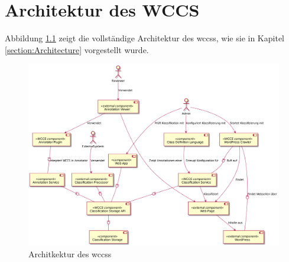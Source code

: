 \chapter{Architektur des WCCS}
    Abbildung \ref{image:wccsExternalArchitecture} zeigt die vollständige Architektur des \glspl{wccs},
    wie sie in Kapitel \ref{section:Architecture} vorgestellt wurde.

    \begin{figure}[htb]
        \centering
        \includegraphics[width=\textwidth]{../resources/architecture/complete_architecture.png}
        \caption{Architkektur des \glspl{wccs}}
        \label{image:wccsExternalArchitecture}
    \end{figure}